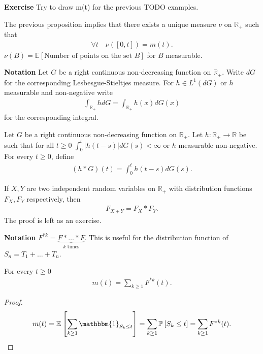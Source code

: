 \textbf{Exercise} Try to draw m(t) for the previous {\color{blue} TODO} examples.

\begin{rmk}[]
	The previous proposition implies that there exists a unique measure $\nu $ on $\mathbb{R}_+$ such that
	\begin{align}
		\forall t \quad \nu ([0,t]) = m(t).
	\end{align}
	$\nu(B)= \mathbb{E}_{} \left[ \textrm{Number of points on the set } B \right] $ for $B$ measurable.	
\end{rmk}
\noindent
\textbf{Notation} Let $G$ be a right continuous non-decreasing function on $\mathbb{R}_+$. Write $dG$ {\color{blue}for} the corresponding Lesbesgue-Stieltjes measure. For $h \in L^{1}(dG)$ or $h$ measurable and non-negative write
\begin{align}
	\int_{\mathbb{R}_+}^{} hdG = \int_{\mathbb{R}_+}^{} h(x)dG(x)
\end{align}
for the corresponding integral.

\begin{defn}
	Let $G$ be a right continuous non-decreasing function on $\mathbb{R}_+$. Let $h: \mathbb{R}_+ \to \mathbb{R}$ {\color{blue}be} such that for all $t\geq 0$ $\int_{0}^{t} |h(t-s)|dG(s) < \infty$ or $h$ measurable non-negative. For every $t\geq 0$, define
	\begin{align}
		(h*G)(t) = \int_{0}^{t} h(t-s)dG(s).
	\end{align}
\end{defn}

\begin{rmk}[]
	If $X, Y$ are two independent random variables on $\mathbb{R}_+$ with distribution functions $F_X, F_Y$ respectively, then
	\begin{align}
		F_{X+Y} = F_X * F_Y.
	\end{align}
The proof is left as an exercise.	
\end{rmk}
\noindent
\textbf{Notation} $F^{*k} = \underbrace{F* \ldots * F}_{k \textrm{ times}}$. This is useful for the distribution function of $S_n = T_1 + \ldots + T_n$.

\begin{prop}[]
	For every $t\geq 0$ 
	\begin{align}
		m(t) = \sum_{k\geq 1}^{} F^{*k}(t).
	\end{align}
\end{prop}
\begin{proof}
	\begin{align}
		m(t) = \mathbb{E}_{} \left[ \sum_{k\geq 1}^{} \mathbbm{1}_{S_k \leq t}  \right] = \sum_{k\geq 1}^{} \mathbb{P}_{} \left[ S_k \leq t \right] = \sum_{k\geq 1}^{} F^{*k}(t).
	\end{align}
\end{proof}


